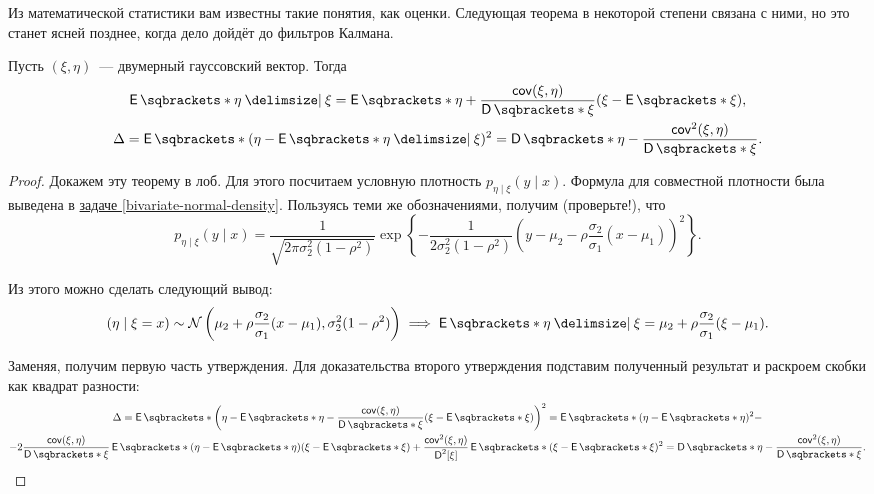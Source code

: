 Из математической статистики вам известны такие понятия, как оценки. Следующая 
теорема в некоторой степени связана с ними, но это станет ясней позднее, когда 
дело дойдёт до фильтров Калмана.
\begin{theorem}
	Пусть \((\xi, \eta)\)~--- двумерный гауссовский вектор. Тогда
	\begin{gather}
		\E{\eta \given \xi} = \E{\eta} + \frac{\cov(\xi, \eta)}{\D{\xi}}(\xi - 
		\E{\xi}), \\
		\Delta = \E{(\eta - \E{\eta \given \xi})^{2}} = \D{\eta} - 
		\frac{\cov^{2}(\xi, \eta)}{\D{\xi}}.
	\end{gather}
\end{theorem}
\begin{proof}
	Докажем эту теорему в лоб. Для этого посчитаем условную плотность \(p_{\eta 
	\mid \xi}(y \mid x)\). Формула для совместной плотности была выведена в 
	\hyperref[bivariate-normal-density]{задаче \ref*{bivariate-normal-density}}.
	Пользуясь теми же обозначениями, получим (проверьте!), что
	\[
		p_{\eta \mid \xi}(y \mid x) = \frac{1}{\sqrt{2\pi\sigma_{2}^{2}(1 - 
		\rho^{2})}}\exp\left\{-\frac{1}{2\sigma_{2}^{2}(1 - \rho^{2})}\left(y - 
		\mu_{2} - \rho\frac{\sigma_{2}}{\sigma_{1}}(x - 
		\mu_{1})\right)^{2}\right\}.
	\]
	
	Из этого можно сделать следующий вывод:
	\[
		(\eta \mid \xi = x) \sim \mathcal{N}\left(\mu_{2} + 
		\rho\frac{\sigma_{2}}{\sigma_{1}}(x - \mu_{1}), \sigma_{2}^{2}(1 - 
		\rho^{2})\right) \implies \E{\eta \given \xi} = \mu_{2} + 
		\rho\frac{\sigma_{2}}{\sigma_{1}}(\xi - \mu_{1}).
	\]
	
	Заменяя, получим первую часть утверждения. Для доказательства второго 
	утверждения подставим полученный результат и раскроем скобки как квадрат 
	разности:
	\begin{multline*}
		\Delta = \E{\left(\eta - \E{\eta} - \frac{\cov(\xi, \eta)}{\D{\xi}}(\xi 
			- \E{\xi})\right)^{2}} = \E{(\eta - \E{\eta})^{2}} - \\ -
			2\frac{\cov(\xi, \eta)}{\D{\xi}}\E{(\eta - \E{\eta})(\xi - 
			\E{\xi})} + \frac{\cov^{2}(\xi, \eta)}{\D^{2}[\xi]}\E{(\xi - 
			\E{\xi})^{2}} = \D{\eta} - \frac{\cov^{2}(\xi, \eta)}{\D{\xi}}. 
			\qedhere
	\end{multline*}
\end{proof}

